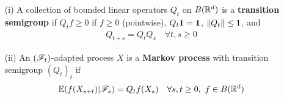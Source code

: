 \documentclass[12pt,a4paper]{article}
\begin{document}
\begin{itemize}
\item[(i)] A collection of bounded linear operators $Q_t$ on $B(\mathbb{R}^d)$ is a \textbf{transition semigroup} if $Q_t f \geq 0$ if $f\geq 0$ (pointwise), $Q_t \bm{1}=\bm{1}$, $\snorms{Q_t}{} \leq 1$, and
\begin{align*}
Q_{t+s} = Q_t Q_s \quad \forall t,s\geq 0
\end{align*}
\item[(ii)] An $(\mathscr{F}_t)$-adapted process $X$ is a \textbf{Markov process} with transition semigroup $(Q_t)_t$ if
\begin{align*}
\mathbb{E}(f(X_{s+t})|\mathscr{F}_s) = Q_t f(X_s) \quad \forall s,t\geq 0, \,\, f\in B(\mathbb{R}^d)
\end{align*}
\end{itemize}
\s
\end{document}
